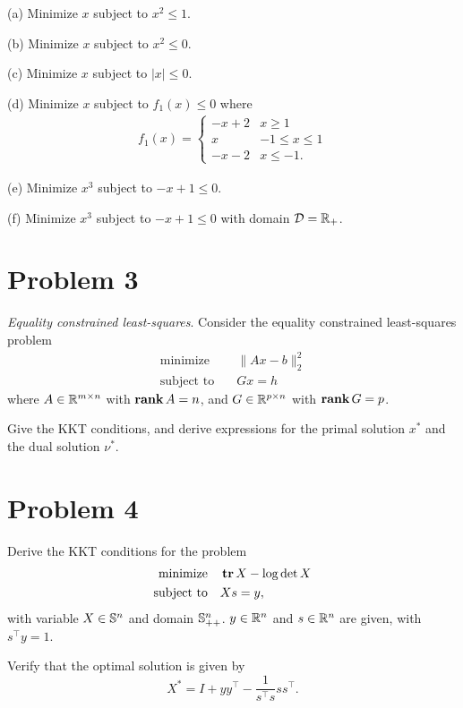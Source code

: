 \documentclass[11pt]{article}
\newcommand{\T}{^\top}          %
\begin{document}
(a) Minimize $x$ subject to $x^2 \leq 1$.

(b) Minimize $x$ subject to $x^2 \leq 0$.

(c) Minimize $x$ subject to $|x| \leq 0$.

(d) Minimize $x$ subject to $f_1(x) \leq 0$ where
\begin{align*}
  f_1(x) = 
  \begin{cases}
    -x + 2 & x \geq 1\\
    x & -1 \leq x \leq 1\\
    -x-2 & x\leq -1.
  \end{cases}
\end{align*}


(e) Minimize $x^3$ subject to $-x + 1 \leq 0$.

(f) Minimize $x^3$ subject to $-x + 1 \leq 0$ with domain $\mathcal{D} = {{\mathbb{R}}}_+$.


\clearpage
\section*{Problem 3}
\textit{Equality constrained least-squares}. Consider the equality constrained least-squares problem
\begin{align*}
  \text{minimize} \quad & \|Ax - b\|^2_2\\
  \text{subject to} \quad & Gx = h
\end{align*}
where $A\in{{\mathbb{R}}}^{m\times n}$ with $\mathop{\textbf{rank}} A = n$, and $G \in{{\mathbb{R}}}^{p\times n}$ with $\mathop{\textbf{rank}} G = p$.

Give the KKT conditions, and derive expressions for the primal solution $x^*$ and the dual solution $\nu^*$.



\clearpage
\section*{Problem 4}
Derive the KKT conditions for the problem
\begin{align*}
  \text{minimize} \quad & \mathop{\textbf{tr}} X - \log\det X\\
  \text{subject to} \quad & Xs = y,
\end{align*}
with variable $X\in{{\mathbb{S}}}^n$ and domain ${{\mathbb{S}}}^n_{++}$. $y\in{{\mathbb{R}}}^n$ and $s\in{{\mathbb{R}}}^n$ are given, with $s\T y = 1$.

Verify that the optimal solution is given by
\[
  X^* = I + yy\T - \frac{1}{s\T s} s s\T.
\]


\clearpage
\end{document}
